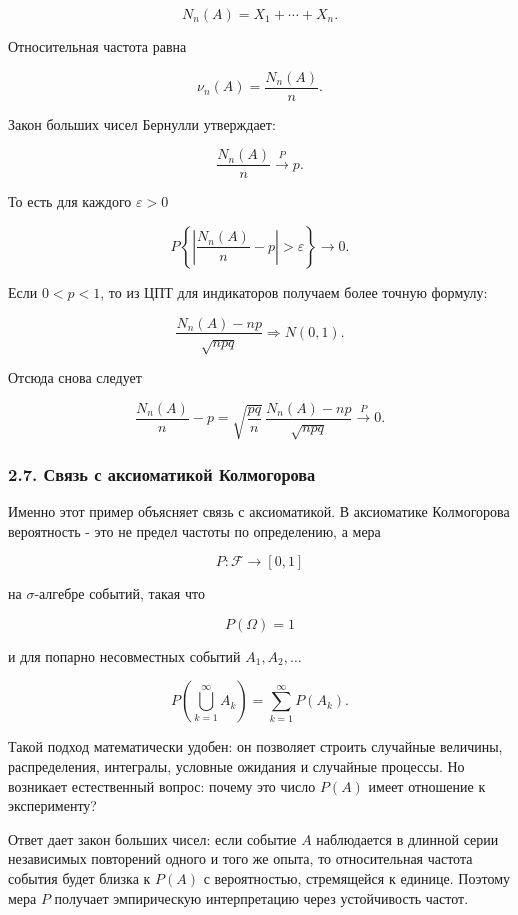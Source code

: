 \documentclass[
  11pt,
  a4paper,
]{article}
\begin{document}
\[
N_n(A)=X_1+\cdots+X_n.
\]

Относительная частота равна

\[
\nu_n(A)=\frac{N_n(A)}{n}.
\]

Закон больших чисел Бернулли утверждает:

\[
\frac{N_n(A)}{n}\xrightarrow{P}p.
\]

То есть для каждого \(\varepsilon>0\)

\[
P\left\{
\left|\frac{N_n(A)}{n}-p\right|>\varepsilon
\right\}
\to0.
\]

Если \(0<p<1\), то из ЦПТ для индикаторов получаем более точную формулу:

\[
\frac{N_n(A)-np}{\sqrt{npq}}
\Rightarrow
N(0,1).
\]

Отсюда снова следует

\[
\frac{N_n(A)}{n}-p
=
\sqrt{\frac{pq}{n}}\,
\frac{N_n(A)-np}{\sqrt{npq}}
\xrightarrow{P}0.
\]

\subsubsection{2.7. Связь с аксиоматикой
Колмогорова}\label{ux441ux432ux44fux437ux44c-ux441-ux430ux43aux441ux438ux43eux43cux430ux442ux438ux43aux43eux439-ux43aux43eux43bux43cux43eux433ux43eux440ux43eux432ux430}

Именно этот пример объясняет связь с аксиоматикой. В аксиоматике
Колмогорова вероятность - это не предел частоты по определению, а мера

\[
P:\mathcal F\to[0,1]
\]

на \(\sigma\)-алгебре событий, такая что

\[
P(\Omega)=1
\]

и для попарно несовместных событий \(A_1,A_2,\ldots\)

\[
P\left(\bigcup_{k=1}^{\infty}A_k\right)
=
\sum_{k=1}^{\infty}P(A_k).
\]

Такой подход математически удобен: он позволяет строить случайные
величины, распределения, интегралы, условные ожидания и случайные
процессы. Но возникает естественный вопрос: почему это число \(P(A)\)
имеет отношение к эксперименту?

Ответ дает закон больших чисел: если событие \(A\) наблюдается в длинной
серии независимых повторений одного и того же опыта, то относительная
частота события будет близка к \(P(A)\) с вероятностью, стремящейся к
единице. Поэтому мера \(P\) получает эмпирическую интерпретацию через
устойчивость частот.
\end{document}
